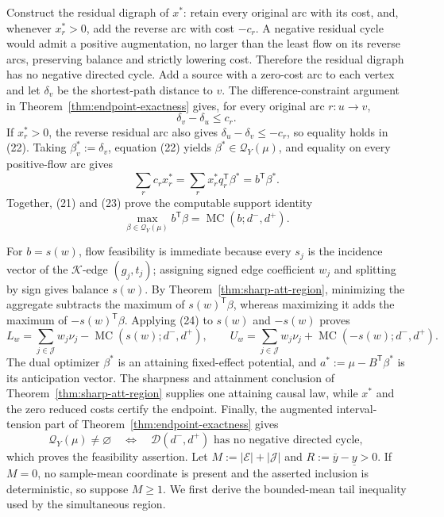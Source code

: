 Construct the residual digraph of \(x^*\): retain every original arc with its cost, and, whenever \(x_r^*>0\), add the reverse arc with cost \(-c_r\).  A negative residual cycle would admit a positive augmentation, no larger than the least flow on its reverse arcs, preserving balance and strictly lowering cost.  Therefore the residual digraph has no negative directed cycle.  Add a source with a zero-cost arc to each vertex and let \(\delta_v\) be the shortest-path distance to \(v\).  The difference-constraint argument in Theorem~\ref{thm:endpoint-exactness} gives, for every original arc \(r:u\to v\),
\[
 \delta_v-\delta_u\le c_r.
\tag{22}
\]
If \(x_r^*>0\), the reverse residual arc also gives \(\delta_u-\delta_v\le-c_r\), so equality holds in (22).  Taking \(\beta_v^*:=\delta_v\), equation (22) yields \(\beta^*\in\mathcal Q_Y(\mu)\), and equality on every positive-flow arc gives
\[
 \sum_r c_rx_r^*
 =\sum_r x_r^*q_r^{\mathsf T}\beta^*
 =b^{\mathsf T}\beta^*.
\tag{23}
\]
Together, (21) and (23) prove the computable support identity
\[
 \max_{\beta\in\mathcal Q_Y(\mu)}b^{\mathsf T}\beta
 =\operatorname{MC}(b;d^-,d^+).
\tag{24}
\]

For \(b=s(w)\), flow feasibility is immediate because every \(s_j\) is the incidence vector of the \(\mathcal K\)-edge \((g_j,t_j)\); assigning signed edge coefficient \(w_j\) and splitting by sign gives balance \(s(w)\).  By Theorem~\ref{thm:sharp-att-region}, minimizing the aggregate subtracts the maximum of \(s(w)^{\mathsf T}\beta\), whereas maximizing it adds the maximum of \(-s(w)^{\mathsf T}\beta\).  Applying (24) to \(s(w)\) and \(-s(w)\) proves
\[
 L_w=\sum_{j\in\mathcal J}w_j\nu_j-
 \operatorname{MC}(s(w);d^-,d^+),
 \qquad
 U_w=\sum_{j\in\mathcal J}w_j\nu_j+
 \operatorname{MC}(-s(w);d^-,d^+).
\tag{25}
\]
The dual optimizer \(\beta^*\) is an attaining fixed-effect potential, and \(a^*:=\mu-B^{\mathsf T}\beta^*\) is its anticipation vector.  The sharpness and attainment conclusion of Theorem~\ref{thm:sharp-att-region} supplies one attaining causal law, while \(x^*\) and the zero reduced costs certify the endpoint.  Finally, the augmented interval-tension part of Theorem~\ref{thm:endpoint-exactness} gives
\[
 \mathcal Q_Y(\mu)\ne\varnothing
 \quad\Longleftrightarrow\quad
 \mathcal D(d^-,d^+)\text{ has no negative directed cycle},
\]
which proves the feasibility assertion.
Let \(M:=|\mathcal E|+|\mathcal J|\) and \(R:=\overline y-\underline y>0\).  If \(M=0\), no sample-mean coordinate is present and the asserted inclusion is deterministic, so suppose \(M\ge1\).  We first derive the bounded-mean tail inequality used by the simultaneous region.


